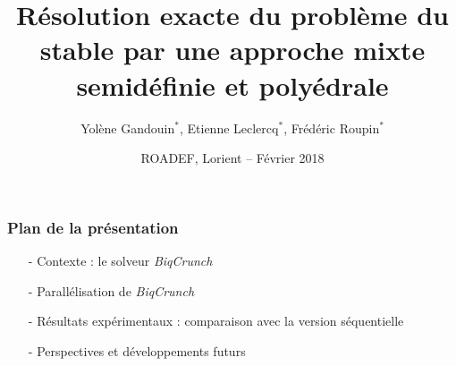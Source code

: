 \documentclass{beamer}
\title[MLTBiqCrunch]{Résolution exacte du problème du stable par une approche mixte semidéfinie et polyédrale}
\author[Gandouin Leclercq Roupin]{\alert{Yolène Gandouin}$^*$, \alert{Etienne Leclercq}$^*$, \alert{Fr\'ed\'eric Roupin}$^*$}
\institute[LIPN]{$^{*}$LIPN, UMR 7030, Universit\'e Paris 13, Sorbonne Paris Cit\'e}
\date[Lorient ROADEF 2018]{ROADEF, Lorient -- F\'evrier 2018}
\def\bleu#1{{\color{blue}#1}}
\newcommand{\biqcrunch}{\emph{\mbox{BiqCrunch}}}
\begin{document}
\begin{frame}
\titlepage
\end{frame}

\begin{frame}
\frametitle{Plan de la présentation}

\Large{
\begin{itemize}
\item[-] \bleu{Contexte : le solveur \biqcrunch}
\vspace{2mm}
\item[-] \bleu{Parallélisation de \biqcrunch}
\vspace{2mm}
\item[-] \bleu{Résultats expérimentaux : comparaison avec la version séquentielle}
\vspace{2mm}
\item[-] \bleu{Perspectives et développements futurs} 
\end{itemize}
}

\end{frame}
\end{document}
